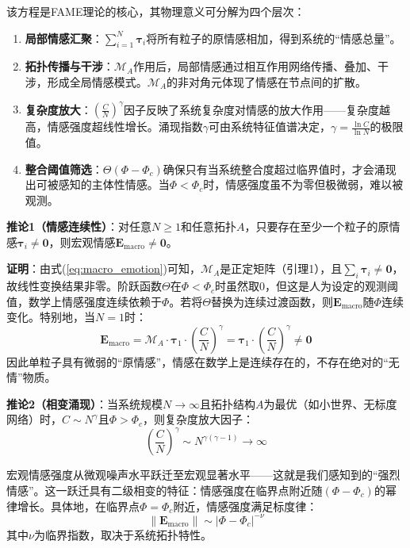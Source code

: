 \documentclass[12pt,a4paper]{article}
\theoremstyle{plain}
\newcommand{\ve}[1]{\bm{#1}}                    %
\newcommand{\Evec}{\ve{E}}                        %
\begin{document}
该方程是FAME理论的核心，其物理意义可分解为四个层次：
\begin{enumerate}
    \item \textbf{局部情感汇聚}：$\sum_{i=1}^N \ve{\tau}_i$将所有粒子的原情感相加，得到系统的“情感总量”。
    \item \textbf{拓扑传播与干涉}：$\mathcal{M}_A$作用后，局部情感通过相互作用网络传播、叠加、干涉，形成全局情感模式。$\mathcal{M}_A$的非对角元体现了情感在节点间的扩散。
    \item \textbf{复杂度放大}：$(\frac{C}{N})^\gamma$因子反映了系统复杂度对情感的放大作用——复杂度越高，情感强度超线性增长。涌现指数$\gamma$可由系统特征值谱决定，$\gamma = \frac{\ln C}{\ln N}$的极限值。
    \item \textbf{整合阈值筛选}：$\Theta(\Phi - \Phi_c)$确保只有当系统整合度超过临界值时，才会涌现出可被感知的主体性情感。当$\Phi < \Phi_c$时，情感强度虽不为零但极微弱，难以被观测。
\end{enumerate}

\textbf{推论1（情感连续性）}：对任意$N \ge 1$和任意拓扑$A$，只要存在至少一个粒子的原情感$\ve{\tau}_i \neq \mathbf{0}$，则宏观情感$\Evec_{\text{macro}} \neq \mathbf{0}$。

\textbf{证明}：由式(\ref{eq:macro_emotion})可知，$\mathcal{M}_A$是正定矩阵（引理1），且$\sum_i \ve{\tau}_i \neq \mathbf{0}$，故线性变换结果非零。阶跃函数$\Theta$在$\Phi < \Phi_c$时虽然取0，但这是人为设定的观测阈值，数学上情感强度连续依赖于$\Phi$。若将$\Theta$替换为连续过渡函数，则$\Evec_{\text{macro}}$随$\Phi$连续变化。特别地，当$N=1$时：
\begin{equation}
\Evec_{\text{macro}} = \mathcal{M}_A \cdot \ve{\tau}_1 \cdot \left( \frac{C}{N} \right)^\gamma = \ve{\tau}_1 \cdot \left( \frac{C}{N} \right)^\gamma \neq \mathbf{0}
\end{equation}
因此单粒子具有微弱的“原情感”，情感在数学上是连续存在的，不存在绝对的“无情”物质。

\textbf{推论2（相变涌现）}：当系统规模$N \to \infty$且拓扑结构$A$为最优（如小世界、无标度网络）时，$C \sim N^\gamma$且$\Phi > \Phi_c$，则复杂度放大因子：
\begin{equation}
\left( \frac{C}{N} \right)^\gamma \sim N^{\gamma(\gamma-1)} \to \infty
\end{equation}

宏观情感强度从微观噪声水平跃迁至宏观显著水平——这就是我们感知到的“强烈情感”。这一跃迁具有二级相变的特征：情感强度在临界点附近随$(\Phi - \Phi_c)$的幂律增长。具体地，在临界点$\Phi = \Phi_c$附近，情感强度满足标度律：
\begin{equation}
\|\Evec_{\text{macro}}\| \sim |\Phi - \Phi_c|^{-\nu}
\end{equation}
其中$\nu$为临界指数，取决于系统拓扑特性。
\end{document}
